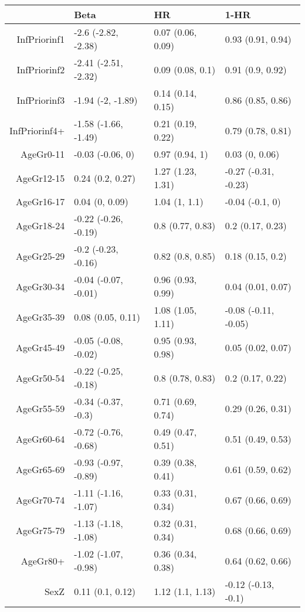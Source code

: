 \begin{table}[ht]
\centering
\begin{tabular}{rlll}
  \hline
 & Beta & HR & 1-HR \\ 
  \hline
InfPriorinf1 & -2.6 (-2.82, -2.38) & 0.07 (0.06, 0.09) & 0.93 (0.91, 0.94) \\ 
  InfPriorinf2 & -2.41 (-2.51, -2.32) & 0.09 (0.08, 0.1) & 0.91 (0.9, 0.92) \\ 
  InfPriorinf3 & -1.94 (-2, -1.89) & 0.14 (0.14, 0.15) & 0.86 (0.85, 0.86) \\ 
  InfPriorinf4+ & -1.58 (-1.66, -1.49) & 0.21 (0.19, 0.22) & 0.79 (0.78, 0.81) \\ 
  AgeGr0-11 & -0.03 (-0.06, 0) & 0.97 (0.94, 1) & 0.03 (0, 0.06) \\ 
  AgeGr12-15 & 0.24 (0.2, 0.27) & 1.27 (1.23, 1.31) & -0.27 (-0.31, -0.23) \\ 
  AgeGr16-17 & 0.04 (0, 0.09) & 1.04 (1, 1.1) & -0.04 (-0.1, 0) \\ 
  AgeGr18-24 & -0.22 (-0.26, -0.19) & 0.8 (0.77, 0.83) & 0.2 (0.17, 0.23) \\ 
  AgeGr25-29 & -0.2 (-0.23, -0.16) & 0.82 (0.8, 0.85) & 0.18 (0.15, 0.2) \\ 
  AgeGr30-34 & -0.04 (-0.07, -0.01) & 0.96 (0.93, 0.99) & 0.04 (0.01, 0.07) \\ 
  AgeGr35-39 & 0.08 (0.05, 0.11) & 1.08 (1.05, 1.11) & -0.08 (-0.11, -0.05) \\ 
  AgeGr45-49 & -0.05 (-0.08, -0.02) & 0.95 (0.93, 0.98) & 0.05 (0.02, 0.07) \\ 
  AgeGr50-54 & -0.22 (-0.25, -0.18) & 0.8 (0.78, 0.83) & 0.2 (0.17, 0.22) \\ 
  AgeGr55-59 & -0.34 (-0.37, -0.3) & 0.71 (0.69, 0.74) & 0.29 (0.26, 0.31) \\ 
  AgeGr60-64 & -0.72 (-0.76, -0.68) & 0.49 (0.47, 0.51) & 0.51 (0.49, 0.53) \\ 
  AgeGr65-69 & -0.93 (-0.97, -0.89) & 0.39 (0.38, 0.41) & 0.61 (0.59, 0.62) \\ 
  AgeGr70-74 & -1.11 (-1.16, -1.07) & 0.33 (0.31, 0.34) & 0.67 (0.66, 0.69) \\ 
  AgeGr75-79 & -1.13 (-1.18, -1.08) & 0.32 (0.31, 0.34) & 0.68 (0.66, 0.69) \\ 
  AgeGr80+ & -1.02 (-1.07, -0.98) & 0.36 (0.34, 0.38) & 0.64 (0.62, 0.66) \\ 
  SexZ & 0.11 (0.1, 0.12) & 1.12 (1.1, 1.13) & -0.12 (-0.13, -0.1) \\ 
   \hline
\end{tabular}
\end{table}
